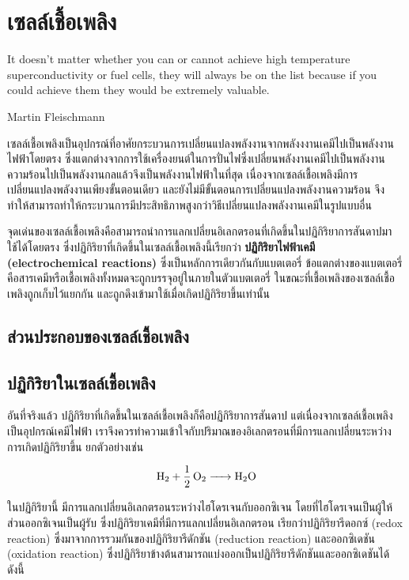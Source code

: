 \documentclass[a4paper,nobib,openany,10pt]{tufte-book}
\begin{document}
\chapter{เซลล์เชื้อเพลิง}
\label{sec:org3c1980a}

\epigraph{It doesn't matter whether you can or cannot achieve high temperature superconductivity or fuel cells, they will always be on the list because if you could achieve them they would be extremely valuable.}{Martin Fleischmann}

เซลล์เชื้อเพลิงเป็นอุปกรณ์ที่อาศัยกระบวนการเปลี่ยนแปลงพลังงานจากพลังงงานเคมีไปเป็นพลังงานไฟฟ้าโดยตรง
ซึ่งแตกต่างจากการใช้เครื่องยนต์ในการปั่นไฟซึ่งเปลี่ยนพลังงานเคมีไปเป็นพลังงานความร้อนไปเป็นพลังงานกลแล้วจึงเป็นพลังงานไฟฟ้าในที่สุด
เนื่องจากเซลล์เชื้อเพลิงมีการเปลี่ยนแปลงพลังงานเพียงขั้นตอนเดียว
และยังไม่มีขั้นตอนการเปลี่ยนแปลงพลังงานความร้อน
จึงทำให้สามารถทำให้กระบวนการมีประสิทธิภาพสูงกว่าวิธีเปลี่ยนแปลงพลังงานเคมีในรูปแบบอื่น

จุดเด่นของเซลล์เชื้อเพลิงคือสามารถนำการแลกเปลี่ยนอิเลกตรอนที่เกิดขึ้นในปฏิกิริยาการสันดาปมาใช้ได้โดยตรง
ซึ่งปฏิกิริยาที่เกิดขึ้นในเซลล์เชื้อเพลิงนี้เรียกว่า \textbf{ปฏิกิริยาไฟฟ้าเคมี
(electrochemical reactions)} ซึ่งเป็นหลักการเดียวกันกับแบตเตอรี่
ข้อแตกต่างของแบตเตอรี่คือสารเคมีหรือเชื้อเพลิงทั้งหมดจะถูกบรรจุอยู่ในภายในตัวแบตเตอรี่
ในขณะที่เชื้อเพลิงของเซลล์เชื้อเพลิงถูกเก็บไว้แยกกัน
และถูกดึงเข้ามาใช้เมื่อเกิดปฏิกิริยาขึ้นเท่านั้น

\section{ส่วนประกอบของเซลล์เชื้อเพลิง}
\label{sec:org7e18495}
\section{ปฏิกิริยาในเซลล์เชื้อเพลิง}
\label{sec:orgf26e9e0}
อันที่จริงแล้ว
ปฎิกิริยาที่เกิดขึ้นในเซลล์เชื้อเพลิงก็คือปฏิกิริยาการสันดาป
แต่เนื่องจากเซลล์เชื้อเพลิงเป็นอุปกรณ์เคมีไฟฟ้า
เราจึงควรทำความเข้าใจกับปริมาณของอิเลกตรอนที่มีการแลกเปลี่ยนระหว่างการเกิดปฏิกิริยาขึ้น
ยกตัวอย่างเช่น

\[ \ce{H2 + 1/2O2 -> H2O} \]

ในปฏิกิริยานี้ มีการแลกเปลี่ยนอิเลกตรอนระหว่างไฮโดรเจนกับออกซิเจน
โดยที่ไฮโดรเจนเป็นผู้ให้ ส่วนออกซิเจนเป็นผู้รับ
ซึ่งปฏิกิริยาเคมีที่มีการแลกเปลี่ยนอิเลกตรอน เรียกว่าปฏิกิริยารีดอกซ์
(redox reaction) ซึ่งมาจากการรวมกันของปฏิกิริยารีดักชัน (reduction
reaction) และออกซิเดชัน (oxidation reaction)
ซึ่งปฏิกิริยาข้างต้นสามารถแบ่งออกเป็นปฏิกิริยารีดักชันและออกซิเดชันได้ดังนี้
\end{document}
